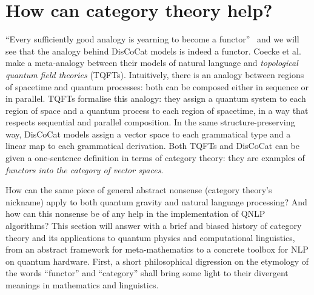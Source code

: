 
\section*{How can category theory help?}


``Every sufficiently good analogy is yearning to become a functor''~\cite{Baez06} and we will see that the analogy behind DisCoCat models is indeed a functor.
Coecke et al.~\cite{CoeckeEtAl13} make a meta-analogy between their models of natural language and \emph{topological quantum field theories} (TQFTs).
Intuitively, there is an analogy between regions of spacetime and quantum processes: both can be composed either in sequence or in parallel.
TQFTs formalise this analogy: they assign a quantum system to each region of space and a quantum process to each region of spacetime, in a way that respects sequential and parallel composition.
In the same structure-preserving way, DisCoCat models assign a vector space to each grammatical type and a linear map to each grammatical derivation.
Both TQFTs and DisCoCat can be given a one-sentence definition in terms of category theory: they are examples of \emph{functors into the category of vector spaces}.

How can the same piece of general abstract nonsense (category theory's nickname) apply to both quantum gravity and natural language processing?
And how can this nonsense be of any help in the implementation of QNLP algorithms?
This section will answer with a brief and biased history of category theory and its applications to quantum physics and computational linguistics, from an abstract framework for meta-mathematics to a concrete toolbox for NLP on quantum hardware.
First, a short philosophical digression on the etymology of the words ``functor'' and ``category'' shall bring some light to their divergent meanings in mathematics and linguistics.

